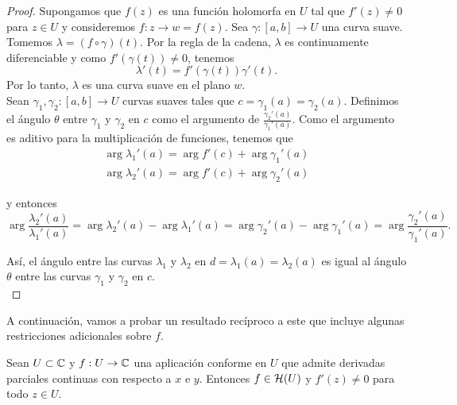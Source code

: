 \begin{proof}
    Supongamos que $f(z)$ es una función holomorfa en $U$ tal que $f'(z) \not = 0$ para $z \in U$ y consideremos $f:z \to w=f(z)$. Sea $\gamma: [a,b] \to U$ una curva suave. Tomemos $\lambda = (f \circ  \gamma)(t)$. Por la regla de la cadena, $\lambda$ es continuamente diferenciable y como $f'(\gamma(t)) \not = 0$, tenemos
    \begin{equation}
        \label{eq:cadena}
        \lambda'(t) = f'(\gamma(t))\gamma'(t).
    \end{equation}
    Por lo tanto, $\lambda$ es una curva suave en el plano $w$. \\

    Sean $\gamma_1, \gamma_2: [a,b] \to U$ curvas suaves tales que $c=\gamma_1(a) = \gamma_2(a)$. Definimos el ángulo $\theta$ entre $\gamma_1$ y $\gamma_2$ en $c$ como el argumento de $\frac{\gamma_2'(a)}{\gamma_1'(a)}$. Como el argumento es aditivo para la multiplicación de funciones, tenemos que
    \begin{equation*}
    \begin{split}
        \arg \lambda_1'(a) = \arg f'(c) + \arg \gamma_1'(a)\\
        \arg \lambda_2'(a) = \arg f'(c) + \arg \gamma_2'(a)
    \end{split}
    \end{equation*}

    y entonces
    \begin{equation*}
        \arg  \frac{\lambda_2'(a)}{\lambda_1'(a)} = \arg \lambda_2'(a) - \arg \lambda_1'(a) = \arg \gamma_2'(a) - \arg \gamma_1'(a) = \arg  \frac{\gamma_2'(a)}{\gamma_1'(a)}.
    \end{equation*}

    Así, el ángulo entre las curvas $\lambda_1$ y $\lambda_2$ en $d = \lambda_1(a) = \lambda_2(a)$ es igual al ángulo $\theta$ entre las curvas $\gamma_1$ y $\gamma_2$ en $c$. \\
\end{proof}

A continuación, vamos a probar un resultado recíproco a este que incluye algunas restricciones adicionales sobre $f$. \\

\begin{prop}
    Sean $U \subset \mathbb{C}$ y $f: U \to \mathbb{C}$ una aplicación conforme en $U$ que admite derivadas parciales continuas con respecto a $x$ e $y$. Entonces $f \in \mathcal{H}(U)$ y $f'(z) \not = 0$ para todo $z \in U$.
\end{prop}

